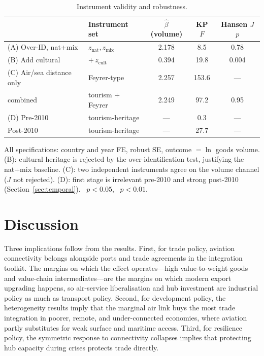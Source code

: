 \begin{table}[t]
\centering
\caption{Instrument validity and robustness.}
\label{tab:robust}
\begin{threeparttable}
\small
\begin{tabular}{llccc}
\toprule
 & Instrument set & $\hat\beta$ (volume) & KP $F$ & Hansen $J$ $p$ \\
\midrule
(A) Over-ID, nat+mix      & $z_{\text{nat}},z_{\text{mix}}$ & 2.178\sym{***} & 8.5 & 0.78 \\
(B) Add cultural          & $+\,z_{\text{cult}}$            & 0.394          & 19.8 & 0.004 \\
(C) Air/sea distance only & Feyrer-type                     & 2.257\sym{***} & 153.6 & --- \\
\quad combined            & tourism $+$ Feyrer              & 2.249\sym{***} & 97.2 & 0.95 \\
(D) Pre-2010              & tourism-heritage                & ---            & 0.3 & --- \\
\quad Post-2010           & tourism-heritage                & ---            & 27.7 & --- \\
\bottomrule
\end{tabular}
\begin{tablenotes}\footnotesize
\item All specifications: country and year FE, robust SE, outcome $=\ln$ goods
volume. (B): cultural heritage is rejected by the over-identification test,
justifying the nat+mix baseline. (C): two independent instruments agree on the
volume channel ($J$ not rejected). (D): first stage is irrelevant pre-2010 and
strong post-2010 (Section~\ref{sec:temporal}).
\sym{**}~$p<0.05$, \sym{***}~$p<0.01$.
\end{tablenotes}
\end{threeparttable}
\end{table}

\section{Discussion}
\label{sec:discussion}
Three implications follow from the results. First, for trade policy, aviation
connectivity belongs alongside ports and trade agreements in the integration
toolkit. The margins on which the effect operates---high value-to-weight goods
and value-chain intermediates---are the margins on which modern export
upgrading happens, so air-service liberalisation and hub investment are
industrial policy as much as transport policy. Second, for development policy,
the heterogeneity results imply that the marginal air link buys the most trade
integration in poorer, remote, and under-connected economies, where aviation
partly substitutes for weak surface and maritime access. Third, for resilience
policy, the symmetric response to connectivity collapses implies that
protecting hub capacity during crises protects trade directly.

